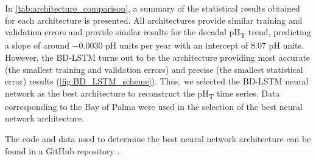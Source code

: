 In \cref{tab:architecture_comparison}, a summary of the statistical results
obtained for each architecture is presented. All architectures provide similar
training and validation errors and provide similar results for the decadal
pH\textsubscript{T} trend, predicting a slope of around $-0.0030$ pH units per
year with an intercept of $8.07$ pH units. However, the BD-LSTM turns out to be
the architecture providing most accurate (the smallest training and validation
errors) and precise (the smallest statistical error) results
(\cref{fig:BD_LSTM_scheme}). Thus, we selected the BD-LSTM neural network as
the best architecture to reconstruct the pH\textsubscript{T} time series.
Data corresponding to the Bay of Palma were used in the selection of the
best neural network architecture.

\begin{table}[H]
    \centering
    \caption[Statistical comparison between different RNN
        architectures]{Statistical comparison between different RNN
        architectures}
    \label{tab:architecture_comparison}
\end{table}

\noindent The code and data used to determine the best neural network
architecture can be found in a GitHub repository \cite{CODE_ph}.
